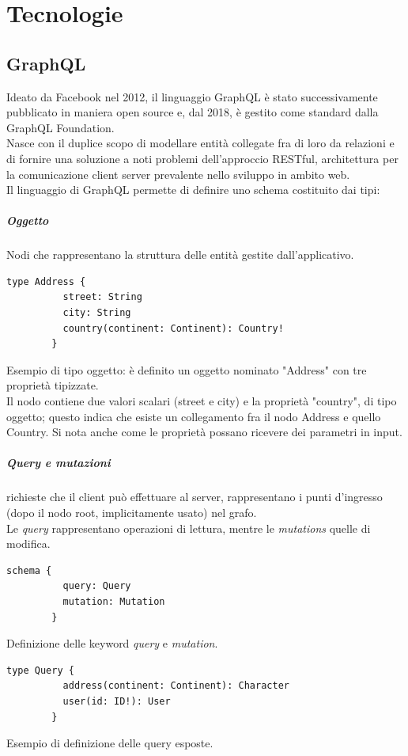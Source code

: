 \documentclass[a4paper, 12pt]{report}
\begin{document}
  \chapter{Tecnologie}
    \section{GraphQL}
      Ideato da Facebook nel 2012, il linguaggio GraphQL è stato successivamente pubblicato in maniera open source e, dal 2018, è gestito come standard dalla GraphQL Foundation.\\
      Nasce con il duplice scopo di modellare entità collegate fra di loro da relazioni e di fornire una soluzione a noti problemi dell'approccio RESTful, architettura per la comunicazione client server prevalente nello sviluppo in ambito web.\\
      
      Il linguaggio di GraphQL permette di definire uno schema costituito dai tipi:
      \paragraph*{Oggetto} Nodi che rappresentano la struttura delle entità gestite dall'applicativo.
      \begin{Verbatim}[samepage=true]
        type Address {
          street: String
          city: String
          country(continent: Continent): Country!
        }
      \end{Verbatim}
      Esempio di tipo oggetto: è definito un oggetto nominato "Address" con tre proprietà tipizzate.\\
      Il nodo contiene due valori scalari (street e city) e la proprietà "country", di tipo oggetto; questo indica che esiste un collegamento fra il nodo Address e quello Country. Si nota anche come le proprietà possano ricevere dei parametri in input.

      \paragraph*{Query e mutazioni} richieste che il client può effettuare al server, rappresentano i punti d'ingresso (dopo il nodo root, implicitamente usato) nel grafo.\\ Le \emph{query} rappresentano operazioni di lettura, mentre le \emph{mutations} quelle di modifica.
      \begin{Verbatim}[samepage=true]
        schema {
          query: Query
          mutation: Mutation
        }
      \end{Verbatim}
      Definizione delle keyword \emph{query} e \emph{mutation}.
      \begin{Verbatim}[samepage=true]
        type Query {
          address(continent: Continent): Character
          user(id: ID!): User
        }
      \end{Verbatim}
      Esempio di definizione delle query esposte.
      
\end{document}
